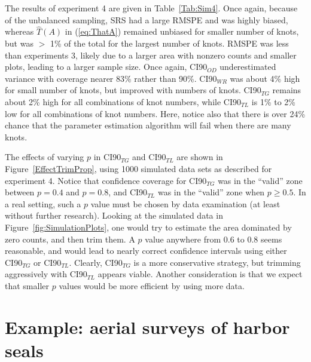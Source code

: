 \documentclass[12pt, titlepage]{article}\usepackage[]{graphicx}\usepackage[]{color}
\begin{document}
The results of experiment 4 are given in Table~\ref{Tab:Sim4}. Once again, because of the unbalanced sampling, SRS had a large RMSPE and was highly biased, whereas $\widehat{T}(A)$ in (\ref{eq:ThatA}) remained unbiased for smaller number of knots, but was $>$ 1\% of the total for the largest number of knots. RMSPE was less than experiments 3, likely due to a larger area with nonzero counts and smaller plots, leading to a larger sample size.  Once again, CI90$_{OD}$ underestimated variance with coverage nearer 83\% rather than 90\%. CI90$_{WR}$ was about 4\% high for small number of knots, but improved with numbers of knots. CI90$_{TG}$ remains about 2\% high for all combinations of knot numbers, while CI90$_{TL}$ is 1\% to 2\% low for all combinations of knot numbers. Here, notice also that there is over 24\% chance that the parameter estimation algorithm will fail when there are many knots.

The effects of varying $p$ in CI90$_{TG}$ and CI90$_{TL}$ are shown in Figure~\ref{EffectTrimProp}, using 1000 simulated data sets as described for experiment 4. Notice that confidence coverage for CI90$_{TG}$ was in the ``valid'' zone  between $p = 0.4$ and $p = 0.8$, and CI90$_{TL}$ was in the ``valid'' zone  when $p \ge 0.5$. In a real setting, such a $p$ value must be chosen by data examination (at least without further research).  Looking at the simulated data in Figure~\ref{fig:SimulationPlots}, one would try to estimate the area dominated by zero counts, and then trim them.  A $p$ value anywhere from 0.6 to 0.8 seems reasonable, and would lead to nearly correct confidence intervals using either CI90$_{TG}$ or CI90$_{TL}$.  Clearly, CI90$_{TG}$ is a more conservative strategy, but trimming aggressively with CI90$_{TL}$ appears viable. Another consideration is that we expect that smaller $p$ values would be more efficient by using more data.


\section{Example: aerial surveys of harbor seals} \label{sec:Example}
\end{document}
